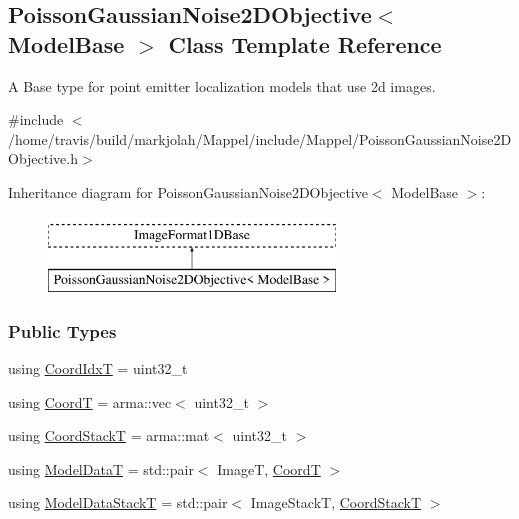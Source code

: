 \hypertarget{classPoissonGaussianNoise2DObjective}{}\subsection{Poisson\+Gaussian\+Noise2\+D\+Objective$<$ Model\+Base $>$ Class Template Reference}
\label{classPoissonGaussianNoise2DObjective}


A Base type for point emitter localization models that use 2d images.  




{\ttfamily \#include $<$/home/travis/build/markjolah/\+Mappel/include/\+Mappel/\+Poisson\+Gaussian\+Noise2\+D\+Objective.\+h$>$}

Inheritance diagram for Poisson\+Gaussian\+Noise2\+D\+Objective$<$ Model\+Base $>$\+:\begin{figure}[H]
\begin{center}
\leavevmode
\includegraphics[height=2.000000cm]{classPoissonGaussianNoise2DObjective}
\end{center}
\end{figure}
\subsubsection*{Public Types}
\begin{DoxyCompactItemize}
\item 
using \hyperlink{classPoissonGaussianNoise2DObjective_a4167a20571c56d874f26f7432e5e3232}{Coord\+IdxT} = uint32\+\_\+t
\item 
using \hyperlink{classPoissonGaussianNoise2DObjective_a4869a86fc5712492b479c26b4d808e38}{CoordT} = arma\+::vec$<$ uint32\+\_\+t $>$
\item 
using \hyperlink{classPoissonGaussianNoise2DObjective_a5842f130c58c7f50fe2e44a76f6981a9}{Coord\+StackT} = arma\+::mat$<$ uint32\+\_\+t $>$
\item 
using \hyperlink{classPoissonGaussianNoise2DObjective_a9ee7fd979e5e5165304e224bff4d8754}{Model\+DataT} = std\+::pair$<$ ImageT, \hyperlink{classPoissonGaussianNoise2DObjective_a4869a86fc5712492b479c26b4d808e38}{CoordT} $>$
\item 
using \hyperlink{classPoissonGaussianNoise2DObjective_af88ce9c09fc860efefeba5569fbd5ac1}{Model\+Data\+StackT} = std\+::pair$<$ Image\+StackT, \hyperlink{classPoissonGaussianNoise2DObjective_a5842f130c58c7f50fe2e44a76f6981a9}{Coord\+StackT} $>$
\end{DoxyCompactItemize}
